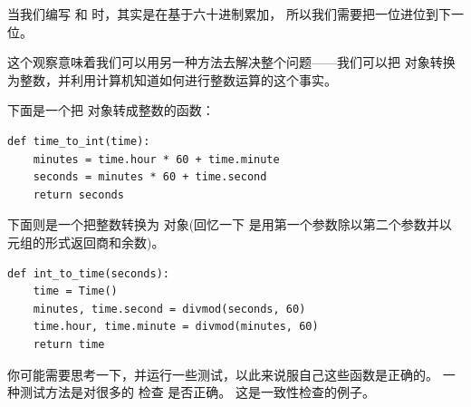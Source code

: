 {%

当我们编写  和  时，其实是在基于六十进制累加，
所以我们需要把一位进位到下一位。


这个观察意味着我们可以用另一种方法去解决整个问题——我们可以把
 对象转换为整数，并利用计算机知道如何进行整数运算的这个事实。


下面是一个把  对象转成整数的函数：

\begin{lstlisting}
def time_to_int(time):
    minutes = time.hour * 60 + time.minute
    seconds = minutes * 60 + time.second
    return seconds
\end{lstlisting}

%

下面则是一个把整数转换为  对象(回忆一下  是用第一个参数除以第二个参数并以元组的形式返回商和余数)。

\begin{lstlisting}
def int_to_time(seconds):
    time = Time()
    minutes, time.second = divmod(seconds, 60)
    time.hour, time.minute = divmod(minutes, 60)
    return time
\end{lstlisting}

%

你可能需要思考一下，并运行一些测试，以此来说服自己这些函数是正确的。
一种测试方法是对很多的  检查 
是否正确。  这是一致性检查的例子。


}
